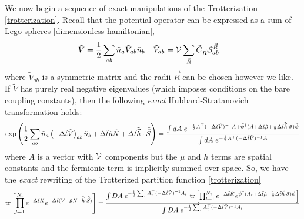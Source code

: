 We now begin a sequence of exact manipulations of the Trotterization \eqref{trotterization}.
Recall that the potential operator can be expressed as a sum of Lego spheres \eqref{dimensionless hamiltonian},
\begin{align}
	\tilde{V}
	&= \frac{1}{2} \sum_{ab} \tilde{n}_a \tilde{V}_{ab} \tilde{n}_b
	&
	\tilde{V}_{ab}
	&=
	\mathcal{V} \sum_{\vec{R}} \tilde{C}_{\vec{R}} \mathcal{S}^{\vec{R}}_{ab}
\end{align}
where $\tilde{V}_{ab}$ is a symmetric matrix and the radii $\vec{R}$ can be chosen however we like.
If $\tilde{V}$ has purely real negative eigenvalues (which imposes conditions on the bare coupling constants), then the following \emph{exact} Hubbard-Stratanovich transformation holds:
\begin{equation}
	\exp\left( \frac{1}{2} \sum_{ab}\tilde{n}_a \left(-\Delta\tilde{t} \tilde{V}\right)_{ab} \tilde{n}_b + \Delta \tilde{t} \tilde{\mu}\tilde{N} + \Delta\tilde{t} \tilde{\vec{h}}\cdot\tilde{\vec{S}}\right)
	=
	\frac{
		\int dA\; e^{-\frac{1}{2} A{}^{\top} (-\Delta\tilde{t} \tilde{V})^{-1} A + \tilde{\psi}{}^{\dagger} (A + \Delta\tilde{t} \tilde{\mu} + \frac{1}{2} \Delta\tilde{t} \tilde{\vec{h}}\cdot\vec{\sigma}) \tilde{\psi}}
	}{
		\int dA\; e^{-\frac{1}{2} A{}^{\top} (-\Delta\tilde{t} \tilde{V})^{-1} A}
	}
\end{equation}
where $A$ is a vector with $\mathcal{V}$ components but the $\mu$ and $h$ terms are spatial constants and the fermionic term is implicitly summed over space.
So, we have the \emph{exact} rewriting of the Trotterized partition function \eqref{trotterization}
\begin{equation}
	\text{tr}\left[\prod_{t=1}^{N_t} e^{-\Delta \tilde{t}\tilde{K}}  e^{-\Delta \tilde{t}(\tilde{V} - \tilde{\mu}\tilde{N} - \tilde{\vec{h}}\cdot\tilde{\vec{S}})} \right]
	= 
	\frac{  
		\int DA\; e^{-\frac{1}{2} \sum_t A{}^{\top}_t (-\Delta\tilde{t} \tilde{V})^{-1} A_t}
	~	\text{tr}\left[\prod_{t=1}^{N_t} e^{-\Delta \tilde{t}\tilde{K}}  e^{ \tilde{\psi}{}^{\dagger} (A_t + \Delta\tilde{t} \tilde{\mu} + \frac{1}{2} \Delta\tilde{t} \tilde{\vec{h}}\cdot\vec{\sigma})\tilde{\psi}} \right] 
	}{ 
		\int DA\; e^{-\frac{1}{2} \sum_t A{}^{\top}_t (-\Delta\tilde{t} \tilde{V})^{-1} A_t}
	}
	\label{eq:trotterization bilinearized}
\end{equation}
